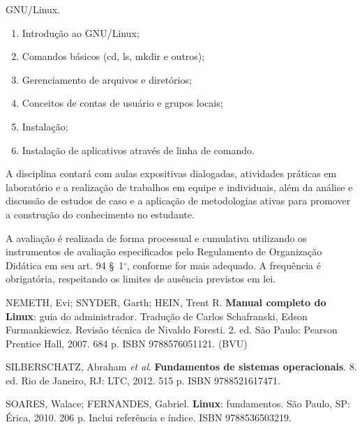\begin{pud}
\begin{description}[itemsep=0em]
        \item[UNIDADE IV:] GNU/Linux.
	         \begin{enumerate}[itemsep=0em, topsep=0em]                
				\item Introdução ao GNU/Linux;
				\item Comandos básicos (cd, ls, mkdir e outros);
	   			\item Gerenciamento de arquivos e diretórios;
				\item Conceitos de contas de usuário e grupos locais;
				\item Instalação;
				\item Instalação de aplicativos através de linha de comando.
	                
            \end{enumerate}
        \end{description}


	\metodologia
	A disciplina contará com aulas expositivas dialogadas, atividades práticas em laboratório e a realização de trabalhos em equipe e individuais, além da análise e discussão de estudos de caso e a aplicação de metodologias ativas para promover a construção do conhecimento no estudante.
	
	\avaliacao
	A avaliação é realizada de forma processual e cumulativa utilizando os instrumentos de avaliação especificados pelo Regulamento de Organização Didática em seu art. 94 \S~1$^\circ$, conforme for mais adequado. A frequência é obrigatória, respeitando os limites de ausência previstos em lei.
	
	\begin{bibbasica}
		
		\item NEMETH, Evi; SNYDER, Garth; HEIN, Trent R. \textbf{Manual completo do Linux}: guia do administrador. Tradução de Carlos Schafranski, Edson Furmankiewicz. Revisão técnica de Nivaldo Foresti. 2. ed. São Paulo: Pearson Prentice Hall, 2007. 684 p. ISBN 9788576051121. (BVU)
		
		\item SILBERSCHATZ, Abraham \textit{et al}. \textbf{Fundamentos de sistemas operacionais}. 8. ed. Rio de Janeiro, RJ: LTC, 2012. 515 p. ISBN 9788521617471.
		\item SOARES, Walace; FERNANDES, Gabriel. \textbf{Linux}: fundamentos. São Paulo, SP: Érica, 2010. 206 p. Inclui referência e índice. ISBN 9788536503219.
	

\end{bibbasica}
\end{pud}
